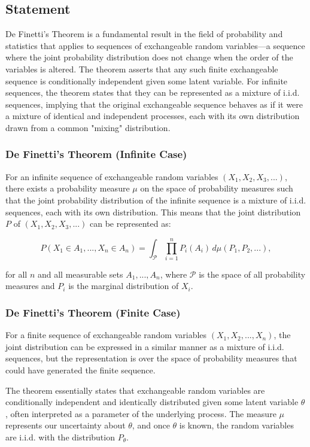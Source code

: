 \documentclass{article}
\begin{document}
\subsection{Statement}
De Finetti's Theorem is a fundamental result in the field of probability and statistics that applies to sequences of exchangeable random variables—a sequence where the joint probability distribution does not change when the order of the variables is altered. The theorem asserts that any such finite exchangeable sequence is conditionally independent given some latent variable. For infinite sequences, the theorem states that they can be represented as a mixture of i.i.d. sequences, implying that the original exchangeable sequence behaves as if it were a mixture of identical and independent processes, each with its own distribution drawn from a common "mixing" distribution.

\subsubsection{De Finetti's Theorem (Infinite Case)}

For an infinite sequence of exchangeable random variables \( (X_1, X_2, X_3, ...) \), there exists a probability measure \( \mu \) on the space of probability measures such that the joint probability distribution of the infinite sequence is a mixture of i.i.d. sequences, each with its own distribution. This means that the joint distribution \( P \) of \( (X_1, X_2, X_3, ...) \) can be represented as:

\[ P(X_1 \in A_1, ..., X_n \in A_n) = \int_{\mathcal{P}} \prod_{i=1}^n P_i(A_i) \, d\mu(P_1, P_2, ...), \]

for all \( n \) and all measurable sets \( A_1, ..., A_n \), where \( \mathcal{P} \) is the space of all probability measures and \( P_i \) is the marginal distribution of \( X_i \).

\subsubsection{De Finetti's Theorem (Finite Case)}

For a finite sequence of exchangeable random variables \( (X_1, X_2, ..., X_n) \), the joint distribution can be expressed in a similar manner as a mixture of i.i.d. sequences, but the representation is over the space of probability measures that could have generated the finite sequence.

The theorem essentially states that exchangeable random variables are conditionally independent and identically distributed given some latent variable \( \theta \), often interpreted as a parameter of the underlying process. The measure \( \mu \) represents our uncertainty about \( \theta \), and once \( \theta \) is known, the random variables are i.i.d. with the distribution \( P_{\theta} \).
\end{document}
